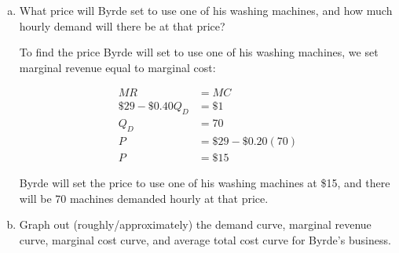 \documentclass{article}
\begin{document}
\begin{enumerate}[(a)]
    \item What price will Byrde set to use one of his washing machines, and how much hourly demand will there be at that price?
    
    To find the price Byrde will set to use one of his washing machines, we set marginal revenue equal to marginal cost:

    \begin{align*}
        MR &= MC \\
        \$29 - \$0.40Q_D &= \$1 \\
        Q_D &= 70 \\
        P &= \$29 - \$0.20(70) \\
        P &= \$15
    \end{align*}

    Byrde will set the price to use one of his washing machines at \$15, and there will be 70 machines demanded hourly at that price.

    \item Graph out (roughly/approximately) the demand curve, marginal revenue curve, marginal cost curve, and average total cost curve for Byrde's business.
    
    \begin{center}
    \end{center}


\end{enumerate}
\end{document}
